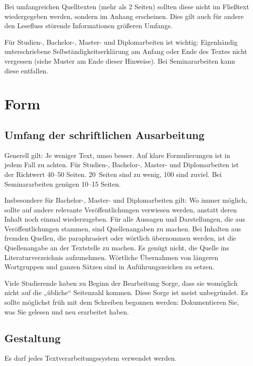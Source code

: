 \documentclass[
    12pt,
    headings=small,
    parskip=half,           %
    bibliography=totoc,
    numbers=noenddot,       %
    open=any,               %
    ]{scrreprt}
\begin{document}
Bei umfangreichen Quelltexten (mehr als 2 Seiten) sollten diese nicht im Fließtext wiedergegeben werden, sondern im Anhang erscheinen. Dies gilt auch für andere den Lesefluss störende Informationen größeren Umfangs.

Für Studien-, Bachelor-, Master- und Diplomarbeiten ist wichtig: Eigenhändig unterschriebene Selbständigkeitserklärung am Anfang oder Ende des Textes nicht vergessen (siehe Muster am Ende dieser Hinweise). Bei Seminararbeiten kann diese entfallen.

\chapter{Form}

\section{Umfang der schriftlichen Ausarbeitung}

Generell gilt: Je weniger Text, umso besser. Auf klare Formulierungen ist in jedem Fall zu achten. Für Studien-, Bachelor-, Master- und Diplomarbeiten ist der Richtwert 40--50 Seiten. 20~Seiten sind zu wenig, 100 sind zuviel. Bei Seminararbeiten genügen 10--15 Seiten.

Insbesondere für Bachelor-, Master- und Diplomarbeiten gilt: Wo immer möglich, sollte auf andere relevante Veröffentlichungen verwiesen werden, anstatt deren Inhalt noch einmal wiederzugeben. Für alle Aussagen und Darstellungen, die aus Veröffentlichungen stammen, sind Quellenangaben zu machen. Bei Inhalten aus fremden Quellen, die paraphrasiert oder wörtlich übernommen werden, ist die Quellenangabe an der Textstelle zu machen. Es genügt nicht, die Quelle ins Literaturverzeichnis aufzunehmen. Wörtliche Übernahmen von längeren Wortgruppen und ganzen Sätzen sind in Anführungszeichen zu setzen.

Viele Studierende haben zu Beginn der Bearbeitung Sorge, dass sie womöglich nicht auf die „übliche“ Seitenzahl kommen. Diese Sorge ist meist unbegründet. Es sollte möglichst früh mit dem Schreiben begonnen werden: Dokumentieren Sie, was Sie gelesen und neu erarbeitet haben.

\section{Gestaltung}

Es darf jedes Textverarbeitungssystem verwendet werden.
\end{document}
